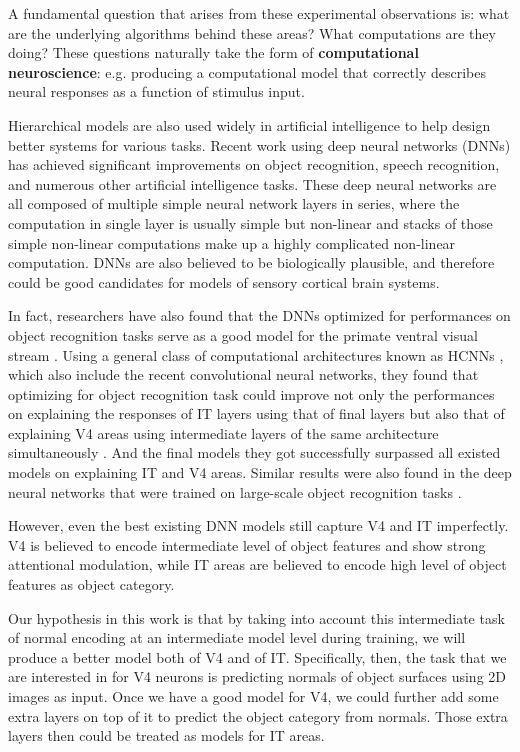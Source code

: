 \documentclass[12pt]{article}
\begin{document}
A fundamental question that arises from these experimental observations is: what are the underlying algorithms behind these areas? What computations are they doing? These questions naturally take the form of \textbf{computational neuroscience}: e.g. producing a computational model that correctly describes neural responses as a function of stimulus input.

Hierarchical models are also used widely in artificial intelligence to help design better systems for various tasks. Recent work using deep neural networks (DNNs) has achieved significant improvements on object recognition, speech recognition, and numerous other artificial intelligence tasks\cite{Krizhevsky, hinton2012deep, lecun2015deep}. These deep neural networks are all composed of multiple simple neural network layers in series, where the computation in single layer is usually simple but non-linear and stacks of those simple non-linear computations make up a highly complicated non-linear computation. DNNs are also believed to be biologically plausible, and therefore could be good candidates for models of sensory cortical brain systems.

In fact, researchers have also found that the DNNs optimized for performances on object recognition tasks serve as a good model for the primate ventral visual stream \cite{Yamins2013, Yamins2014, Cadieu2014}. Using a general class of computational architectures known as HCNNs \cite{lecun1995convolutional}, which also include the recent convolutional neural networks, they found that optimizing for object recognition task could improve not only the performances on explaining the responses of IT layers using that of final layers but also that of explaining V4 areas using intermediate layers of the same architecture simultaneously \cite{Cadieu2014}. And the final models they got successfully surpassed all existed models on explaining IT and V4 areas. Similar results were also found in the deep neural networks that were trained on large-scale object recognition tasks \cite{Yamins2014}. 

However, even the best existing DNN models still capture V4 and IT imperfectly. V4 is believed to encode intermediate level of object features and show strong attentional modulation\cite{Roe2012}, while IT areas are believed to encode high level of object features as object category. 

Our hypothesis in this work is that by taking into account this intermediate task of normal encoding at an intermediate model level during training, we will produce a better model both of V4 and of IT. Specifically, then, the task that we are interested in for V4 neurons is predicting normals of object surfaces using 2D images as input. Once we have a good model for V4, we could further add some extra layers on top of it to predict the object category from normals. Those extra layers then could be treated as models for IT areas. 
\end{document}
